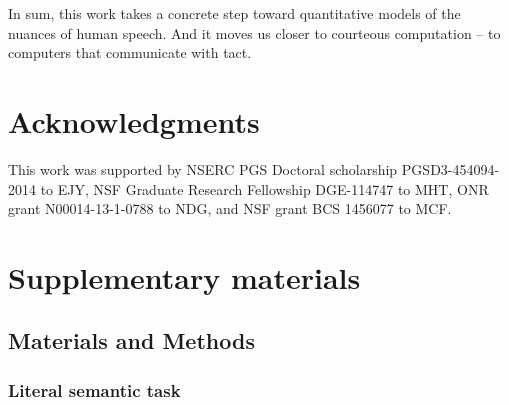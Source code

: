 \documentclass[12pt]{article}
\begin{document}
In sum, this work takes a concrete step toward quantitative models of
the nuances of human speech. And it moves us closer to courteous
computation -- to computers that communicate with tact.












\section*{Acknowledgments}
This work was supported by NSERC PGS Doctoral scholarship
PGSD3-454094-2014 to EJY, NSF Graduate Research Fellowship DGE-114747 to
MHT, ONR grant N00014-13-1-0788 to NDG, and NSF grant BCS 1456077 to
MCF.


\section*{Supplementary materials}

\subsection*{Materials and Methods}\label{materials-and-methods}

\subsubsection*{Literal semantic task}\label{literal-semantic-task}
\end{document}
